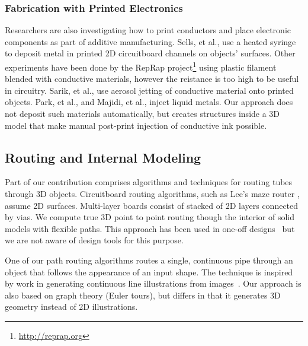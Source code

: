 \subsubsection{Fabrication with Printed Electronics}
Researchers are also investigating how to print conductors and place electronic components as part of additive manufacturing.  Sells, et al., \cite{Sells-reprap} use a heated syringe to deposit metal in printed 2D circuitboard channels on objects' surfaces.  Other experiments have been done by the RepRap project\footnote{\url{http://reprap.org}} using plastic filament blended with conductive materials, however the reistance is too high to be useful in circuitry.  Sarik, et al., \cite{Sarik-tracebrush} use aerosol jetting of conductive material onto printed objects.  Park, et al., \cite{Park-microchannels} and Majidi, et al., \cite{Majidi-curvature} inject liquid metals.   Our approach does not deposit such materials automatically, but creates structures inside a 3D model that make manual post-print injection of conductive ink possible.

\subsection{Routing and Internal Modeling}
Part of our contribution comprises algorithms and techniques for routing tubes through 3D objects.
Circuitboard routing algorithms, such as Lee's maze router \cite{Lee-maze}, assume 2D surfaces. Multi-layer boards consist of stacked of 2D layers connected by vias. We compute true 3D point to point routing though the interior of solid models with flexible paths. This approach has been used in one-off designs~\cite{Navarrette-gps} but we are not aware of design tools for this purpose.

One of our path routing algorithms routes a single, continuous pipe through an object that follows the appearance of an input shape. The technique is inspired by work in generating continuous line illustrations from images~\cite{Wong-continuousline,Bosch-tsp}. Our approach is also based on graph theory (Euler tours), but differs in that it generates 3D geometry instead of 2D illustrations.

